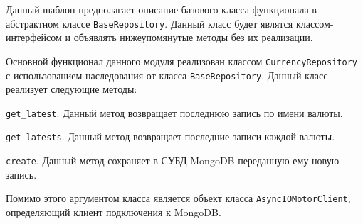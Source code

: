 Данный шаблон предполагает описание базового класса функционала в абстрактном классе \lstinline{BaseRepository}.
Данный класс будет являтся классом-интерфейсом и объявлять нижеупомянутые методы без их реализации.

Основной функционал данного модуля реализован классом \lstinline{CurrencyRepository} с использованием наследования от класса \lstinline{BaseRepository}.
Данный класс реализует следующие методы:
\begin{enumerate_num}
    \item \lstinline{get_latest}.
    Данный метод возвращает последнюю запись по имени валюты.
    \item \lstinline{get_latests}.
    Данный метод возвращает последние записи каждой валюты.
    \item \lstinline{create}.
    Данный метод сохраняет в СУБД MongoDB переданную ему новую запись.
\end{enumerate_num}
Помимо этого аргументом класса является объект класса \lstinline{AsyncIOMotorClient}, определяющий клиент подключения к MongoDB.



